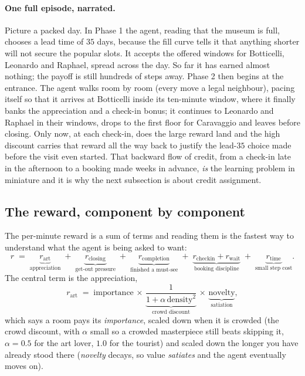 \documentclass[11pt]{article}
\newcommand{\key}[1]{\textit{#1}}            %
\begin{document}
\paragraph{One full episode, narrated.} Picture a packed day. In Phase 1 the agent, reading
that the museum is full, chooses a lead time of $35$ days, because the fill curve tells it
that anything shorter will not secure the popular slots. It accepts the offered windows for
Botticelli, Leonardo and Raphael, spread across the day. So far it has earned almost
nothing; the payoff is still hundreds of steps away. Phase 2 then begins at the entrance. The
agent walks room by room (every move a legal neighbour), pacing itself so that it arrives at
Botticelli inside its ten-minute window, where it finally banks the appreciation and a
check-in bonus; it continues to Leonardo and Raphael in their windows, drops to the first
floor for Caravaggio and leaves before closing. Only now, at each check-in, does the large
reward land and the high discount carries that reward all the way back to justify the
lead-$35$ choice made before the visit even started. That backward flow of credit, from a
check-in late in the afternoon to a booking made weeks in advance, \emph{is} the learning
problem in miniature and it is why the next subsection is about credit assignment.

\subsection{The reward, component by component}

The per-minute reward is a sum of terms and reading them is the fastest way to understand
what the agent is being asked to want:
\begin{equation}
r \;=\; \underbrace{r_{\text{art}}}_{\text{appreciation}} \;+\; \underbrace{r_{\text{closing}}}_{\text{get-out pressure}} \;+\; \underbrace{r_{\text{completion}}}_{\text{finished a must-see}} \;+\; \underbrace{r_{\text{checkin}} + r_{\text{wait}}}_{\text{booking discipline}} \;+\; \underbrace{r_{\text{time}}}_{\text{small step cost}} .
\label{eq:reward}
\end{equation}
The central term is the appreciation,
\begin{equation}
r_{\text{art}} \;=\; \text{importance} \,\times\, \underbrace{\frac{1}{1+\alpha\,\text{density}^2}}_{\text{crowd discount}} \,\times\, \underbrace{\text{novelty}}_{\text{satiation}} ,
\label{eq:rart}
\end{equation}
which says a room pays its \key{importance}, scaled down when it is crowded (the crowd
discount, with $\alpha$ small so a crowded masterpiece still beats skipping it, $\alpha=0.5$
for the art lover, $1.0$ for the tourist) and scaled down the longer you have already
stood there (\key{novelty} decays, so value \key{satiates} and the agent eventually moves
on).
\end{document}
